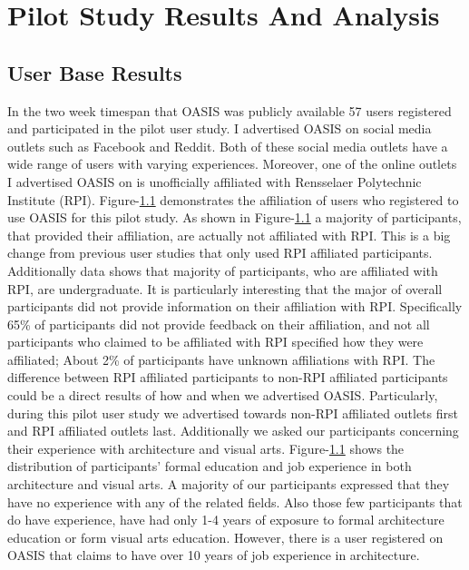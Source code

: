 \chapter{Pilot Study Results And Analysis} \label{sec:results}

\section{User Base Results}

In the two week timespan that OASIS was publicly available 57 users registered and participated in the pilot user study.
I advertised OASIS on social media outlets such as Facebook and Reddit.
Both of these social media outlets have a wide range of users with varying experiences.
Moreover, one of the online outlets I advertised OASIS on is unofficially affiliated with Rensselaer Polytechnic Institute (RPI).
Figure-\ref{} demonstrates the affiliation of users who registered to use OASIS for this pilot study.
As shown in Figure-\ref{} a majority of participants, that provided their affiliation, are actually not affiliated with RPI. 
This is a big change from previous user studies that only used RPI affiliated participants.
Additionally data shows that majority of participants, who are affiliated with RPI, are undergraduate.
It is particularly interesting that the major of overall participants did not provide information on their affiliation with RPI.
Specifically 65\% of participants did not provide feedback on their affiliation, and not all participants who claimed to be affiliated with RPI specified how they were affiliated;
About 2\% of participants have unknown affiliations with RPI.
The difference between RPI affiliated participants to non-RPI affiliated participants could be a direct results of how and when we advertised OASIS.
Particularly, during this pilot user study we advertised towards non-RPI affiliated outlets first and  RPI affiliated outlets last.
Additionally we asked our participants concerning their experience with architecture and visual arts.
Figure-\ref{} shows the distribution of participants' formal education and job experience in both architecture and visual arts.
A majority of our participants expressed that they have no experience with any of the related fields. 
Also those few participants that do have experience, have had only 1-4 years of exposure to formal architecture education or form visual arts education.
However, there is a user registered on OASIS that claims to have over 10 years of job experience in architecture.

